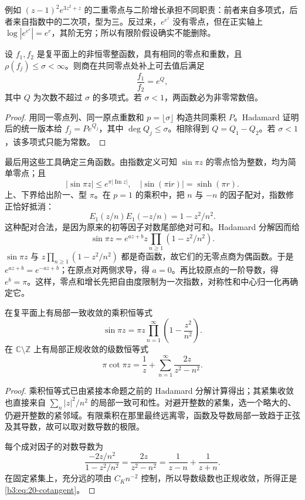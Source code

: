 例如 \((z-1)^2e^{3z^2+z}\) 的二重零点与二阶增长承担不同职责：前者来自多项式，后者来自指数中的二次项，型为三。反过来，\(e^{e^z}\) 没有零点，但在正实轴上 \(\log|e^{e^r}|=e^r\)，其阶无穷；所以有限阶假设确实不能删除。

\begin{corollary}[同零点有限阶函数的商]\label{b3:cor:20-same-zeros}
设 \(f_1,f_2\) 是复平面上的非恒零整函数，具有相同的零点和重数，且 \(\rho(f_j)\le\sigma<\infty\)。则商在共同零点处补上可去值后满足
\[
 \frac{f_1}{f_2}=e^Q,
\]
其中 \(Q\) 为次数不超过 \(\sigma\) 的多项式。若 \(\sigma<1\)，两函数必为非零常数倍。
\end{corollary}
\begin{proof}
用同一零点列、同一原点重数和 \(p=\lfloor\sigma\rfloor\) 构造共同乘积 \(P\)。Hadamard 证明后的统一版本给 \(f_j=Pe^{Q_j}\)，其中 \(\deg Q_j\le\sigma\)。相除得到 \(Q=Q_1-Q_2\)。若 \(\sigma<1\)，该多项式只能为常数。
\end{proof}

最后用这些工具确定三角函数。由指数定义可知 \(\sin\pi z\) 的零点恰为整数，均为简单零点；且
\[
 |\sin\pi z|\le e^{\pi|\operatorname{Im}z|},
 \quad |\sin(\pi\mathrm{i}r)|=\sinh(\pi r).
\]
上、下界给出阶一、型 \(\pi\)。在 \(p=1\) 的乘积中，把 \(n\) 与 \(-n\) 的因子配对，指数修正恰好抵消：
\[
 E_1(z/n)E_1(-z/n)=1-z^2/n^2.
\]
这种配对合法，是因为原来的初等因子对数尾部绝对可和。Hadamard 分解因而给
\[
 \sin\pi z=e^{az+b}z\prod_{n\ge1}(1-z^2/n^2).
\]
\(\sin\pi z\) 与 \(z\prod_{n\ge1}(1-z^2/n^2)\) 都是奇函数，故它们的无零点商为偶函数。于是 \(e^{az+b}=e^{-az+b}\)；在原点对两侧求导，得 \(a=0\)。再比较原点的一阶导数，得 \(e^b=\pi\)。这样，零点和增长先把自由度限制为一次指数，对称性和中心归一化再确定它。

\begin{proposition}[正弦乘积与余切展开]\label{b3:prop:20-sine-product}
在复平面上有局部一致收敛的乘积恒等式
\begin{equation}\label{b3:eq:20-sine-product}
 \sin\pi z=\pi z\prod_{n=1}^{\infty}\left(1-\frac{z^2}{n^2}\right).
\end{equation}
在 \(\mathbb C\setminus\mathbb Z\) 上有局部正规收敛的级数恒等式
\begin{equation}\label{b3:eq:20-cotangent}
 \pi\cot\pi z=\frac1z+\sum_{n=1}^{\infty}\frac{2z}{z^2-n^2}.
\end{equation}
\end{proposition}
\begin{proof}
乘积恒等式已由紧接本命题之前的 Hadamard 分解计算得出；其紧集收敛也直接来自 \(\sum_n|z|^2/n^2\) 的局部一致可和性。对避开整数的紧集，选一个略大的、仍避开整数的紧邻域。有限乘积在那里最终远离零，函数及导数局部一致趋于正弦及其导数，故可以取对数导数的极限。

每个成对因子的对数导数为
\[
 \frac{-2z/n^2}{1-z^2/n^2}=\frac{2z}{z^2-n^2}
 =\frac1{z-n}+\frac1{z+n}.
\]
在固定紧集上，充分远的项由 \(C_Kn^{-2}\) 控制，所以导数级数也正规收敛，所得正是\eqref{b3:eq:20-cotangent}。
\end{proof}

